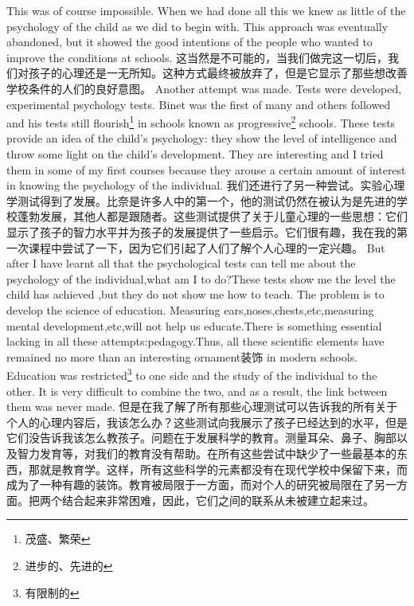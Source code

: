 \documentclass[lang=cn,10pt]{elegantbook}
\begin{document}
This was of course impossible. When we had done all this we knew as little of the psychology of the child as we did to begin with. This approach was eventually abandoned, but it showed the good intentions of the people who wanted to improve the conditions at schools.
这当然是不可能的，当我们做完这一切后，我们对孩子的心理还是一无所知。这种方式最终被放弃了，但是它显示了那些想改善学校条件的人们的良好意图。
Another attempt was made. Tests were developed, experimental psychology tests. Binet was the first of many and others followed and his tests still flourish\footnote{茂盛、繁荣} in schools known as progressive\footnote{进步的、先进的} schools. These tests provide an idea of the child's psychology: they show the level of intelligence and throw some light on the child's development. They are interesting and I tried them in some of my first courses because they arouse a certain amount of interest in knowing the psychology of the individual.
我们还进行了另一种尝试。实验心理学测试得到了发展。比奈是许多人中的第一个，他的测试仍然在被认为是先进的学校蓬勃发展，其他人都是跟随者。这些测试提供了关于儿童心理的一些思想：它们显示了孩子的智力水平并为孩子的发展提供了一些启示。它们很有趣，我在我的第一次课程中尝试了一下，因为它们引起了人们了解个人心理的一定兴趣。
But after I have learnt all that the psychological tests can tell me about the psychology of  the individual,what am I to do?These tests show me the level the child has achieved ,but they do not show me how to teach. The problem is to develop the science of education. Measuring ears,noses,chests,etc,measuring mental development,etc,will not help us educate.There is something essential lacking in all these attempts:pedagogy.Thus, all these scientific elements have remained no more than an interesting ornament装饰 in modern schools. Education was restricted\footnote{有限制的} to one side and the study of the individual to the other. It is very difficult to combine the two, and as a result, the link between them was never made.
但是在我了解了所有那些心理测试可以告诉我的所有关于个人的心理内容后，我该怎么办？这些测试向我展示了孩子已经达到的水平，但是它们没告诉我该怎么教孩子。问题在于发展科学的教育。测量耳朵、鼻子、胸部以及智力发育等，对我们的教育没有帮助。在所有这些尝试中缺少了一些最基本的东西，那就是教育学。这样，所有这些科学的元素都没有在现代学校中保留下来，而成为了一种有趣的装饰。教育被局限于一方面，而对个人的研究被局限在了另一方面。把两个结合起来非常困难，因此，它们之间的联系从未被建立起来过。
\end{document}
